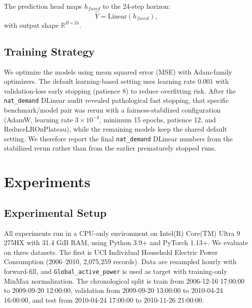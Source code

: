 \documentclass[pdflatex,sn-mathphys-num]{sn-jnl}
\theoremstyle{thmstyleone}
\theoremstyle{thmstyletwo}
\theoremstyle{thmstylethree}
\begin{document}
The prediction head maps $h_{fused}$ to the 24-step horizon:
\begin{equation}
\hat{Y} = \text{Linear}(h_{fused}),
\end{equation}
with output shape $\mathbb{R}^{B \times 24}$.

\subsection{Training Strategy}

We optimize the models using mean squared error (MSE) with Adam-family optimizers.\cite{kingma2014adam} The default learning-based setting uses learning rate $0.001$ with validation-loss early stopping (patience 8) to reduce overfitting risk.\cite{prechelt1998early} After the \texttt{nat\_demand} DLinear audit revealed pathological fast stopping, that specific benchmark/model pair was rerun with a fairness-stabilized configuration (AdamW, learning rate $3\times 10^{-4}$, minimum 15 epochs, patience 12, and ReduceLROnPlateau), while the remaining models keep the shared default setting. We therefore report the final \texttt{nat\_demand} DLinear numbers from the stabilized rerun rather than from the earlier prematurely stopped runs.

\section{Experiments}

\subsection{Experimental Setup}

All experiments run in a CPU-only environment on Intel(R) Core(TM) Ultra 9 275HX with 31.4 GiB RAM, using Python 3.9+ and PyTorch 1.13+. We evaluate on three datasets. The first is UCI Individual Household Electric Power Consumption (2006--2010, 2,075,259 records).\cite{hebrail2012individual} Data are resampled hourly with forward-fill, and \texttt{Global\_active\_power} is used as target with training-only MinMax normalization. The chronological split is train from 2006-12-16 17:00:00 to 2009-09-20 12:00:00, validation from 2009-09-20 13:00:00 to 2010-04-24 16:00:00, and test from 2010-04-24 17:00:00 to 2010-11-26 21:00:00.
\end{document}
